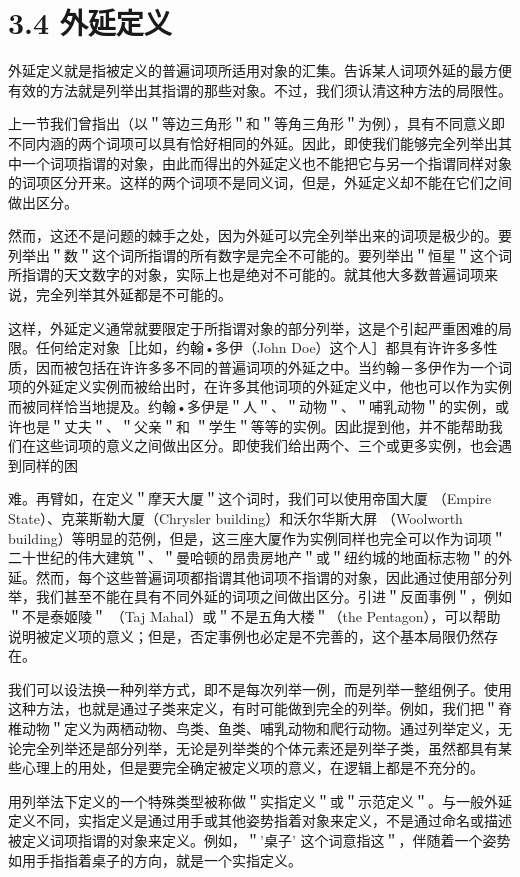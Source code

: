 \section*{3.4 外延定义}
外延定义就是指被定义的普遍词项所适用对象的汇集。告诉某人词项外延的最方便有效的方法就是列举出其指谓的那些对象。不过，我们须认清这种方法的局限性。

上一节我们曾指出（以＂等边三角形＂和＂等角三角形＂为例），具有不同意义即不同内涵的两个词项可以具有恰好相同的外延。因此，即使我们能够完全列举出其中一个词项指谓的对象，由此而得出的外延定义也不能把它与另一个指谓同样对象的词项区分开来。这样的两个词项不是同义词，但是，外延定义却不能在它们之间做出区分。

然而，这还不是问题的棘手之处，因为外延可以完全列举出来的词项是极少的。要列举出＂数＂这个词所指谓的所有数字是完全不可能的。要列举出＂恒星＂这个词所指谓的天文数字的对象，实际上也是绝对不可能的。就其他大多数普遍词项来说，完全列举其外延都是不可能的。

这样，外延定义通常就要限定于所指谓对象的部分列举，这是个引起严重困难的局限。任何给定对象［比如，约翰•多伊（John Doe）这个人］都具有许许多多性质，因而被包括在许许多多不同的普遍词项的外延之中。当约翰－多伊作为一个词项的外延定义实例而被给出时，在许多其他词项的外延定义中，他也可以作为实例而被同样恰当地提及。约翰•多伊是＂人＂、＂动物＂、＂哺乳动物＂的实例，或许也是＂丈夫＂、＂父亲＂和 ＂学生＂等等的实例。因此提到他，并不能帮助我们在这些词项的意义之间做出区分。即使我们给出两个、三个或更多实例，也会遇到同样的困

难。再臂如，在定义＂摩天大厦＂这个词时，我们可以使用帝国大厦 （Empire State）、克莱斯勒大厦（Chrysler building）和沃尔华斯大屏 （Woolworth building）等明显的范例，但是，这三座大厦作为实例同样也完全可以作为词项＂二十世纪的伟大建筑＂、＂曼哈顿的昂贵房地产＂或＂纽约城的地面标志物＂的外延。然而，每个这些普遍词项都指谓其他词项不指谓的对象，因此通过使用部分列举，我们甚至不能在具有不同外延的词项之间做出区分。引进＂反面事例＂，例如＂不是泰姬陵＂ （Taj Mahal）或＂不是五角大楼＂（the Pentagon），可以帮助说明被定义项的意义；但是，否定事例也必定是不完善的，这个基本局限仍然存在。

我们可以设法换一种列举方式，即不是每次列举一例，而是列举一整组例子。使用这种方法，也就是通过子类来定义，有时可能做到完全的列举。例如，我们把＂脊椎动物＂定义为两栖动物、鸟类、鱼类、哺乳动物和爬行动物。通过列举定义，无论完全列举还是部分列举，无论是列举类的个体元素还是列举子类，虽然都具有某些心理上的用处，但是要完全确定被定义项的意义，在逻辑上都是不充分的。

用列举法下定义的一个特殊类型被称做＂实指定义＂或＂示范定义＂。与一般外延定义不同，实指定义是通过用手或其他姿势指着对象来定义，不是通过命名或描述被定义词项指谓的对象来定义。例如，＂'桌子' 这个词意指这＂，伴随着一个姿势如用手指指着桌子的方向，就是一个实指定义。

